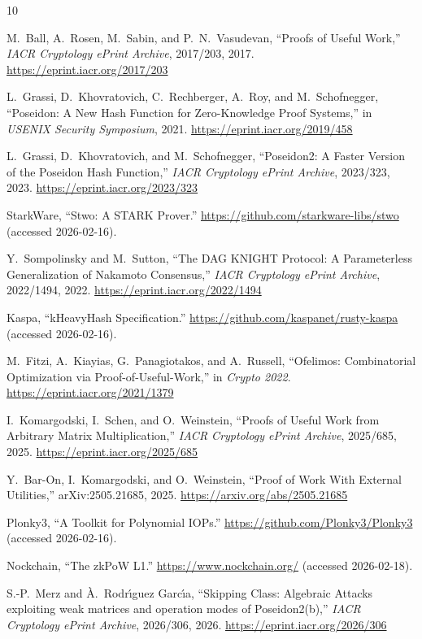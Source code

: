 \documentclass[11pt,a4paper]{article}
\begin{document}
\begin{thebibliography}{10}

M.~Ball, A.~Rosen, M.~Sabin, and P.~N.~Vasudevan,
``Proofs of Useful Work,''
\emph{IACR Cryptology ePrint Archive}, 2017/203, 2017.
\url{https://eprint.iacr.org/2017/203}

L.~Grassi, D.~Khovratovich, C.~Rechberger, A.~Roy, and M.~Schofnegger,
``Poseidon: A New Hash Function for Zero-Knowledge Proof Systems,''
in \emph{USENIX Security Symposium}, 2021.
\url{https://eprint.iacr.org/2019/458}

L.~Grassi, D.~Khovratovich, and M.~Schofnegger,
``Poseidon2: A Faster Version of the Poseidon Hash Function,''
\emph{IACR Cryptology ePrint Archive}, 2023/323, 2023.
\url{https://eprint.iacr.org/2023/323}

StarkWare,
``Stwo: A STARK Prover.''
\url{https://github.com/starkware-libs/stwo} (accessed 2026-02-16).

Y.~Sompolinsky and M.~Sutton,
``The DAG KNIGHT Protocol: A Parameterless Generalization of Nakamoto Consensus,''
\emph{IACR Cryptology ePrint Archive}, 2022/1494, 2022.
\url{https://eprint.iacr.org/2022/1494}

Kaspa,
``kHeavyHash Specification.''
\url{https://github.com/kaspanet/rusty-kaspa} (accessed 2026-02-16).

M.~Fitzi, A.~Kiayias, G.~Panagiotakos, and A.~Russell,
``Ofelimos: Combinatorial Optimization via Proof-of-Useful-Work,''
in \emph{Crypto 2022}.
\url{https://eprint.iacr.org/2021/1379}

I.~Komargodski, I.~Schen, and O.~Weinstein,
``Proofs of Useful Work from Arbitrary Matrix Multiplication,''
\emph{IACR Cryptology ePrint Archive}, 2025/685, 2025.
\url{https://eprint.iacr.org/2025/685}

Y.~Bar-On, I.~Komargodski, and O.~Weinstein,
``Proof of Work With External Utilities,''
arXiv:2505.21685, 2025.
\url{https://arxiv.org/abs/2505.21685}

Plonky3,
``A Toolkit for Polynomial IOPs.''
\url{https://github.com/Plonky3/Plonky3} (accessed 2026-02-16).

Nockchain,
``The zkPoW L1.''
\url{https://www.nockchain.org/} (accessed 2026-02-18).

S.-P.~Merz and {\`A}.~Rodr{\'\i}guez Garc{\'\i}a,
``Skipping Class: Algebraic Attacks exploiting weak matrices and operation modes of Poseidon2(b),''
\emph{IACR Cryptology ePrint Archive}, 2026/306, 2026.
\url{https://eprint.iacr.org/2026/306}


\end{thebibliography}
\end{document}
